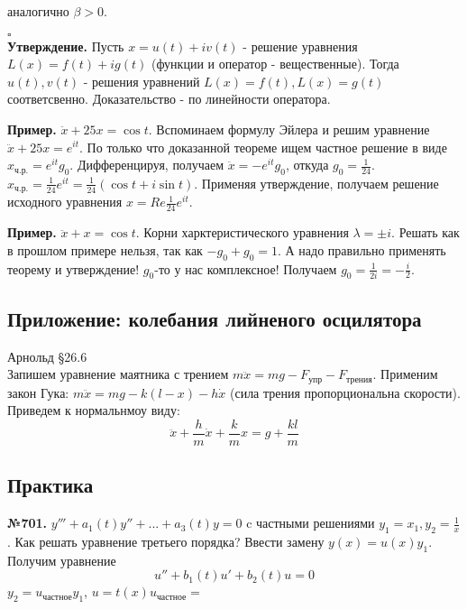 аналогично $\beta > 0$. 

$\square$ \\
\textbf{Утверждение.} Пусть $x = u(t) + iv(t)$ - решение уравнения
 $L(x) = f(t) + ig(t)$ (функции и оператор - вещественные). 
 Тогда  $u(t),v(t)$ - решения уравнений 
$L(x) = f(t),L(x) = g(t)$ соответсвенно. Доказательство - по линейности 
оператора.

\textbf{Пример.} $\ddot x + 25x = \cos t$. Вспоминаем формулу Эйлера и 
решим уравнение $\ddot x + 25x = e^{it}$. По только что доказанной теореме
ищем частное решение в виде $x_\text{ч.р.} = e^{it}g_0$. Дифференцируя, 
получаем $\ddot x = -e^{it}g_0$, откуда $g_0 = \frac{1}{24}$. 
$x_\text{ч.р.} = \frac{1}{24}e^{it} = \frac{1}{24}(\cos t + i\sin t)$.
Применяя утверждение, получаем решение исходного уравнения 
$x = Re \frac{1}{24}e^{it}$.

\textbf{Пример.} $\ddot x + x = \cos t$. Корни харктеристического
уравнения $\lambda = \pm i$. Решать как в прошлом примере нельзя, так как
$-g_0 + g_0 = 1$. А надо правильно применять теорему и утверждение! $g_0$-то
у нас комплексное! Получаем $g_0 = \frac{1}{2i} = -\frac{i}{2}$. 

\subsection{Приложение: колебания лийненого осцилятора}
Арнольд \S 26.6\\
Запишем уравнение маятника с трением
$m\ddot x = mg - F_\text{упр} - F_\text{трения}$.
Применим закон Гука:
$m\ddot x = mg - k(l-x) - h\dot x$ (сила трения пропорциональна скорости).
Приведем к нормальнмоу виду:
$$\ddot x + \frac{h}{m}\dot x + \frac{k}{m} x = g + \frac{kl}{m}$$
























\newpage
\subsection{Практика} %

\textbf{№701.} $y'''+a_1(t)y''+...+a_3(t)y=0$ c частными решениями 
$y_1=x_1,y_2=\frac{1}{x}$. Как решать уравнение третьего порядка?
Ввести замену $y(x)=u(x)y_1$. Получим уравнение 
$$u''+b_1(t)u'+b_2(t)u=0$$
$y_2=u_\text{частное}y_1$, $u=t(x)u_\text{частное}=$

